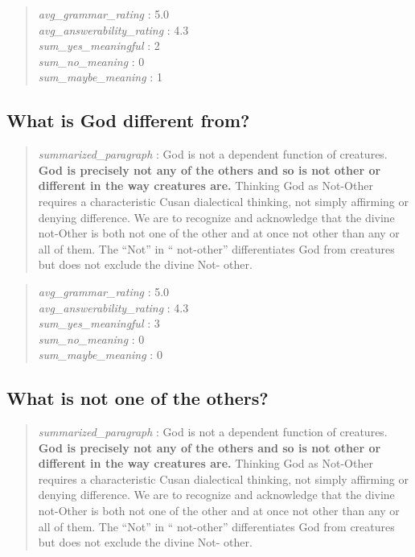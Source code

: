 \begin{quote}
\emph{avg\_grammar\_rating} : 5.0\\
\emph{avg\_answerability\_rating} : 4.3\\
\emph{sum\_yes\_meaningful} : 2\\
\emph{sum\_no\_meaning} : 0\\
\emph{sum\_maybe\_meaning} : 1
\end{quote}

\hypertarget{what-is-god-different-from}{%
\subsection{What is God different
from?}\label{what-is-god-different-from}}

\begin{quote}
\emph{summarized\_paragraph} : God is not a dependent function of
creatures. \textbf{God is precisely not any of the others and so is not
other or different in the way creatures are.} Thinking God as Not-Other
requires a characteristic Cusan dialectical thinking, not simply
affirming or denying difference. We are to recognize and acknowledge
that the divine not-Other is both not one of the other and at once not
other than any or all of them. The ``Not'' in `` not-other''
differentiates God from creatures but does not exclude the divine Not-
other.
\end{quote}

\begin{quote}
\emph{avg\_grammar\_rating} : 5.0\\
\emph{avg\_answerability\_rating} : 4.3\\
\emph{sum\_yes\_meaningful} : 3\\
\emph{sum\_no\_meaning} : 0\\
\emph{sum\_maybe\_meaning} : 0
\end{quote}

\hypertarget{what-is-not-one-of-the-others}{%
\subsection{What is not one of the
others?}\label{what-is-not-one-of-the-others}}

\begin{quote}
\emph{summarized\_paragraph} : God is not a dependent function of
creatures. \textbf{God is precisely not any of the others and so is not
other or different in the way creatures are.} Thinking God as Not-Other
requires a characteristic Cusan dialectical thinking, not simply
affirming or denying difference. We are to recognize and acknowledge
that the divine not-Other is both not one of the other and at once not
other than any or all of them. The ``Not'' in `` not-other''
differentiates God from creatures but does not exclude the divine Not-
other.
\end{quote}

